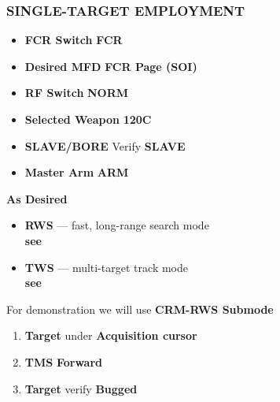 \subsubsection{SINGLE-TARGET EMPLOYMENT}
\label{subsec:aim120:single}
\begin{checklistenumerate}
    \blueitem[Prerequisites]
    \begin{itemize}
        \item \textbf{FCR Switch} \dotfill \textbf{FCR}
        \item \textbf{Desired MFD} \dotfill \textbf{FCR Page (SOI)}
        \item \textbf{RF Switch} \dotfill \textbf{NORM}
        \item \textbf{Selected Weapon} \dotfill \textbf{120C}
        \item \textbf{SLAVE/BORE} \dotfill Verify \textbf{SLAVE}
        \item \textbf{Master Arm} \dotfill \textbf{ARM}
    \end{itemize}
     \textbf{As Desired}
    \begin{itemize}
        \item \textbf{RWS} --- fast, long-range search mode \\
        \textbf{see }
        \item \textbf{TWS} --- multi-target track mode \\
        \textbf{see }
    \end{itemize}
    For demonstration we will use \textbf{CRM-RWS Submode} 

    \begin{enumerate}
        \item \textbf{Target} \dotfill under \textbf{Acquisition cursor}
        \item \textbf{TMS} \dotfill \textbf{Forward}
        \item \textbf{Target} \dotfill verify \textbf{Bugged}
    \end{enumerate}
    

\end{checklistenumerate}
